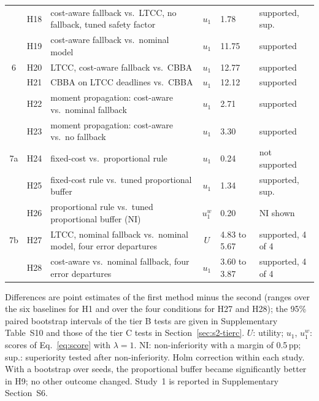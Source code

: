 \documentclass[a4paper,fleqn]{cas-dc}
\newcommand{\mname}{LTCC}  %
\newcounter{prop}
\begin{document}
\begin{table}[t]
\begin{threeparttable}
\begin{tabular}{@{}cllcll@{}}
  & H18 & cost-aware fallback vs.\ \mname{}, no fallback, tuned safety factor & $u_1$ & 1.78 & supported, sup. \\
  & H19 & cost-aware fallback vs.\ nominal model & $u_1$ & 11.75 & supported \\
\midrule
6 & H20 & \mname{}, cost-aware fallback vs.\ CBBA & $u_1$ & 12.77 & supported \\
  & H21 & CBBA on \mname{} deadlines vs.\ CBBA & $u_1$ & 12.12 & supported \\
  & H22 & moment propagation: cost-aware vs.\ nominal fallback & $u_1$ & 2.71 & supported \\
  & H23 & moment propagation: cost-aware vs.\ no fallback & $u_1$ & 3.30 & supported \\
\midrule
7a & H24 & fixed-cost vs.\ proportional rule & $u_1$ & 0.24 & not supported \\
  & H25 & fixed-cost rule vs.\ tuned proportional buffer & $u_1$ & 1.34 & supported, sup. \\
  & H26 & proportional rule vs.\ tuned proportional buffer (NI) & $u^w_1$ & 0.20 & NI shown \\
\midrule
7b & H27 & \mname{}, nominal fallback vs.\ nominal model, four error departures & $U$ & 4.83 to
5.67 & supported, 4 of 4 \\
  & H28 & cost-aware vs.\ nominal fallback, four error departures & $u_1$ & 3.60 to
3.87 & supported, 4 of 4 \\
\bottomrule
\end{tabular}
\begin{tablenotes}[flushleft]\scriptsize
\item[] Differences are point estimates of the first method minus the second (ranges over the six baselines for H1 and
over the four conditions for H27 and H28); the 95\% paired bootstrap intervals of the tier B tests are given in
Supplementary Table~S10 and those of the tier C tests in Section~\ref{sec:s2-tierc}. $U$: utility; $u_1$, $u^w_1$: scores of Eq.~\eqref{eq:score} with $\lambda=1$. NI:
non-inferiority with a margin of 0.5\,pp; sup.: superiority tested after non-inferiority. Holm correction within each
study. With a bootstrap over seeds, the proportional buffer became significantly better in H9; no other outcome
changed. Study~1 is reported in Supplementary Section~S6.
\end{tablenotes}
\end{threeparttable}
\end{table}
\endgroup
\end{document}
